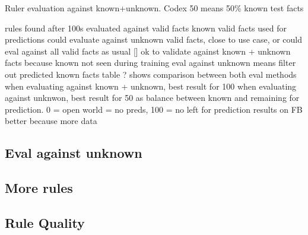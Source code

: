 
\begin{table}
    \centering
    
    \caption{Ruler evaluation against known+unknown. Codex 50 means 50\% known test facts}
    \label{tab:5_experiments/5_ruler/results}
\end{table}

rules found after 100s evaluated against valid facts
known valid facts used for predictions
could evaluate against unknown valid facts, close to use case, or could eval against all valid facts as usual []
ok to validate against known + unknown facts because known not seen during training
eval against unknown means filter out predicted known facts
table ? shows comparison between both eval methods
when evaluating against known + unknown, best result for 100
when evaluating against unknwon, best result for 50 as balance between known and remaining for prediction. 0 = open world = no preds, 100 = no left for prediction
results on FB better because more data

\subsection{Eval against unknown}
\label{subsec:5_experiments/5_ruler/1_unknown}


\subsection{More rules}
\label{subsec:5_experiments/5_ruler/2_rule_count}


\subsection{Rule Quality}
\label{subsec:5_experiments/5_ruler/3_rule_quality}

